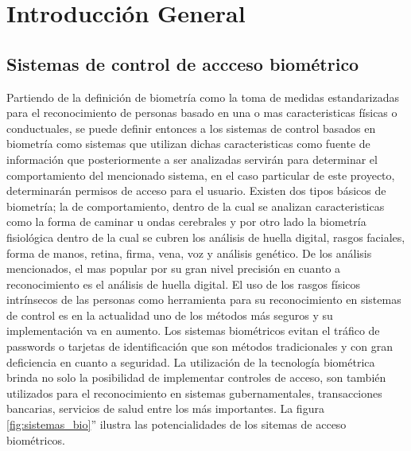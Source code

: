 
\chapter{Introducción General} %

\label{Chapter1} %
\label{IntroGeneral}


\newcommand{\keyword}[1]{\textbf{#1}}
\newcommand{\tabhead}[1]{\textbf{#1}}
\newcommand{\code}[1]{\texttt{#1}}
\newcommand{\file}[1]{\texttt{\bfseries#1}}
\newcommand{\option}[1]{\texttt{\itshape#1}}
\newcommand{\grados}{$^{\circ}$}



\section{Sistemas de control de accceso biométrico}

Partiendo de la definición de biometría como la toma de medidas estandarizadas para el reconocimiento de personas basado en una o mas caracteristicas físicas o conductuales, se puede definir entonces a los sistemas de control basados en biometría como sistemas que utilizan dichas caracteristicas como fuente de información que posteriormente a ser analizadas servirán para determinar el comportamiento del mencionado sistema, en el caso particular de este proyecto, determinarán permisos de acceso para el usuario.
Existen dos tipos básicos de biometría; la de comportamiento, dentro de la cual se analizan caracteristicas como la forma de caminar u ondas cerebrales y por otro lado la biometría fisiológica dentro de la cual se cubren los análisis de huella digital, rasgos faciales, forma de manos, retina, firma, vena, voz y análisis genético.
De los análisis mencionados, el mas popular por su gran nivel precisión en cuanto a reconocimiento es el análisis de huella digital.  
El uso de los rasgos físicos intrínsecos de las personas como herramienta para su reconocimiento en sistemas de control es en la actualidad uno de los métodos más seguros y su implementación va en aumento. Los sistemas biométricos evitan el tráfico de passwords o tarjetas de identificación que son métodos tradicionales y con gran deficiencia en cuanto a seguridad.
La utilización de la tecnología biométrica brinda no solo la posibilidad de implementar  controles de acceso, son también utilizados para el reconocimiento en sistemas gubernamentales, transacciones bancarias, servicios de salud entre los más importantes.
La figura \ref{fig:sistemas_bio}'' ilustra las potencialidades de los sitemas de acceso biométricos.

